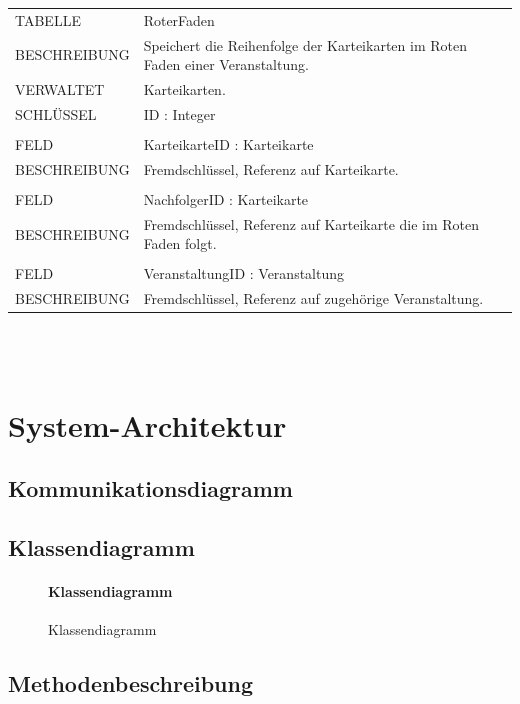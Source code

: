 \documentclass[12pt,a4paper]{article}
\begin{document}
\begin{tabular}{|lp{12cm}|}
	\hline
	TABELLE			&  RoterFaden\\ 
	BESCHREIBUNG	&  Speichert die Reihenfolge der Karteikarten im Roten Faden einer Veranstaltung.\\ 
	VERWALTET		&  Karteikarten.\\ 
	SCHLÜSSEL		&  ID : Integer\\ 
	\hline
	&  \\
	FELD		    &  KarteikarteID : Karteikarte\\ 
	BESCHREIBUNG	&  Fremdschlüssel, Referenz auf Karteikarte.\\
	&  \\
	FELD		    &  NachfolgerID : Karteikarte\\ 
	BESCHREIBUNG	&  Fremdschlüssel, Referenz auf Karteikarte die im Roten Faden folgt.\\
	&  \\
	FELD		    &  VeranstaltungID : Veranstaltung\\ 
	BESCHREIBUNG	&  Fremdschlüssel, Referenz auf zugehörige Veranstaltung.\\
	\hline
\end{tabular}\\\\


\section{System-Architektur}

\subsection{Kommunikationsdiagramm}

\subsection{Klassendiagramm}

\begin{figure}[H]
	\centering
	\paragraph{Klassendiagramm}
	\caption{Klassendiagramm}
	\label{Klassendiagramm des Teilsystems}
\end{figure}

\subsection{Methodenbeschreibung}
\end{document}
